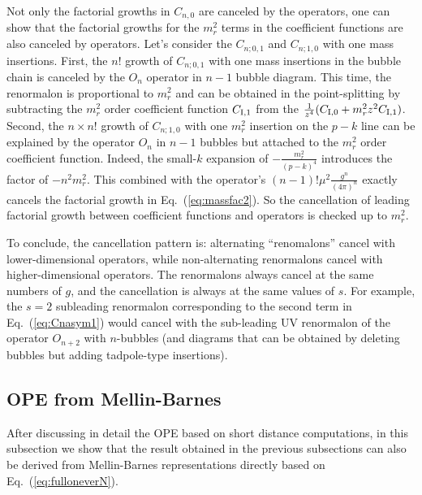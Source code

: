 \documentclass[a4paper,11pt]{article}
\begin{document}
Not only the factorial growths in $C_{n,0}$ are canceled by the operators, one can show that the factorial growths for the $m_r^2$ terms in the coefficient functions are also canceled by operators. Let's consider the $C_{n;0,1}$ and $C_{n;1,0}$ with one mass insertions. First, the $n!$ growth of $C_{n;0,1}$ with one mass insertions in the bubble chain is canceled by the $O_{n}$ operator in $n-1$ bubble diagram. This time, the renormalon is proportional to $m_r^2$ and can be obtained in the point-splitting by subtracting the $m_r^2$ order coefficient function $C_{{\rm I},1}$ from the $\frac{1}{z^4}(C_{{\rm I},0}+m_r^2z^2C_{{\rm I},1})$. Second, the $n\times n!$ growth of $C_{n;1,0}$ with one $m_r^2$ insertion on the $p-k$ line can be explained by the operator $O_{n}$ in $n-1$ bubbles but attached to the $m_r^2$ order coefficient function. Indeed, the small-$k$ expansion of $-\frac{m_r^2}{(p-k)^4}$ introduces the factor of $-n^2m_r^2$. This combined with the operator's $(n-1)!\mu^2\frac{g^{n}}{(4\pi)^n}$ exactly cancels the factorial growth in Eq.~(\ref{eq:massfac2}). So the cancellation of leading factorial growth between coefficient functions and operators is checked up to $m_r^2$.

To conclude, the cancellation pattern is: alternating ``renomalons'' cancel with lower-dimensional operators, while non-alternating renormalons cancel with higher-dimensional operators. The renormalons always cancel at the same numbers of $g$, and the cancellation is always at the same values of $s$. For example, the $s=2$ subleading renormalon corresponding to the second term in Eq.~(\ref{eq:Cnasym1}) would cancel with the sub-leading UV renormalon of the operator $O_{n+2}$ with $n$-bubbles (and diagrams that can be obtained by deleting bubbles but adding tadpole-type insertions).  




\subsection{OPE from Mellin-Barnes}
After discussing in detail the OPE based on short 
distance computations, in this subsection we show that the result obtained in the previous subsections can also be derived from Mellin-Barnes representations directly based on Eq.~(\ref{eq:fulloneverN}). 
\end{document}
